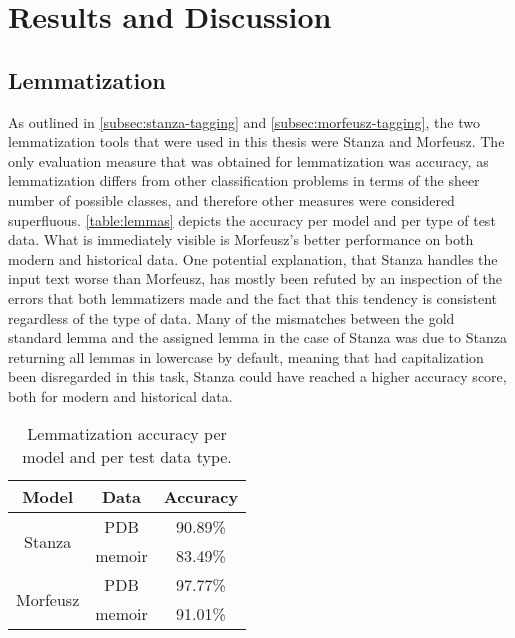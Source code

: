 \section{Results and Discussion}
\label{sec:results}

\subsection{Lemmatization}
\label{subsec:lemmatization}

As outlined in \autoref{subsec:stanza-tagging} and \autoref{subsec:morfeusz-tagging}, the two lemmatization tools that were used in this thesis were Stanza and Morfeusz. The only evaluation measure that was obtained for lemmatization was accuracy, as lemmatization differs from other classification problems in terms of the sheer number of possible classes, and therefore other measures were considered superfluous. \autoref{table:lemmas} depicts the accuracy per model and per type of test data. What is immediately visible is Morfeusz's better performance on both modern and historical data. One potential explanation, that Stanza handles the input text worse than Morfeusz, has mostly been refuted by an inspection of the errors that both lemmatizers made and the fact that this tendency is consistent regardless of the type of data. Many of the mismatches between the gold standard lemma and the assigned lemma in the case of Stanza was due to Stanza returning all lemmas in lowercase by default, meaning that had capitalization been disregarded in this task, Stanza could have reached a higher accuracy score, both for modern and historical data.  \\

\renewcommand{\arraystretch}{1.25}
\begin{table}[h]
\begin{center}
\begin{tabular}{|cc|c|}
\hline \bf Model & \bf Data & \bf Accuracy \\ \hline
\multirow{2}{4em}{Stanza}
& PDB & 90.89\%  \\
& memoir & 83.49\%  \\
\multirow{2}{4em}{Morfeusz}
& PDB & 97.77\%  \\
& memoir & 91.01\% \\ 
\hline
\end{tabular}
\caption{\label{table:lemmas} Lemmatization accuracy per model and per test data type.}
\end{center}
\end{table}

